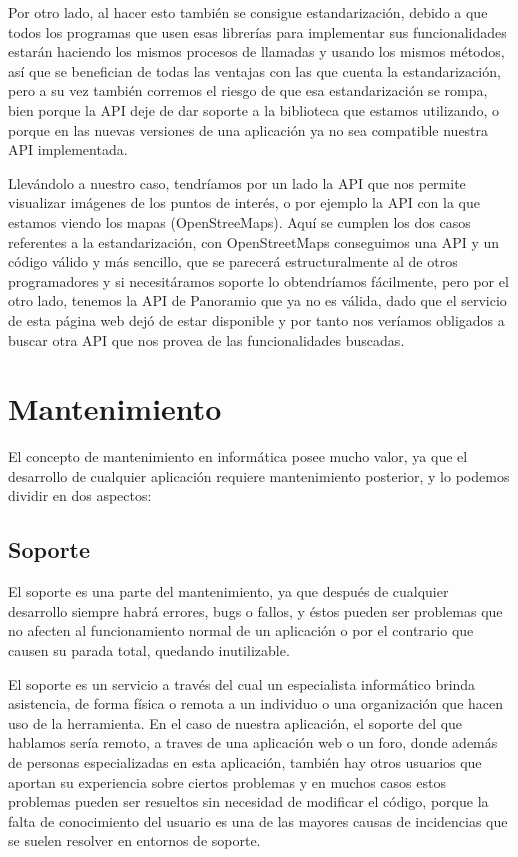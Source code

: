 Por otro lado, al hacer esto también se consigue estandarización, debido a que todos los programas que usen esas librerías para implementar sus funcionalidades estarán haciendo los mismos procesos de llamadas y usando los mismos métodos, así que se benefician de todas las ventajas con las que cuenta la estandarización, pero a su vez también corremos el riesgo de que esa estandarización se rompa, bien porque la API deje de dar soporte a la biblioteca que estamos utilizando, o porque en las nuevas versiones de una aplicación ya no sea compatible nuestra API implementada. 

Llevándolo a nuestro caso, tendríamos por un lado la API que nos permite visualizar imágenes de los puntos de interés, o por ejemplo la API con la que estamos viendo los mapas (OpenStreeMaps). Aquí se cumplen los dos casos referentes a la estandarización, con OpenStreetMaps conseguimos una API y un código válido y más sencillo, que se parecerá estructuralmente al de otros programadores y si necesitáramos soporte lo obtendríamos fácilmente, pero por el otro lado, tenemos la API de Panoramio que ya no es válida, dado que el servicio de esta página web dejó de estar disponible y por tanto nos veríamos obligados a buscar otra API que nos provea de las funcionalidades buscadas.

\section{Mantenimiento}

El concepto de mantenimiento en informática posee mucho valor, ya que el desarrollo de cualquier aplicación requiere mantenimiento posterior, y lo podemos dividir en dos aspectos:

\subsection{Soporte}

El soporte es una parte del mantenimiento, ya que después de cualquier desarrollo siempre habrá errores, bugs o fallos, y éstos pueden ser problemas que no afecten al funcionamiento normal de un aplicación o por el contrario que causen su parada total, quedando inutilizable. 

El soporte es un servicio a través del cual un especialista informático brinda asistencia, de forma física o remota a un individuo o una organización que hacen uso de la herramienta. En el caso de nuestra aplicación, el soporte del que hablamos sería remoto, a traves de una aplicación web o un foro, donde además de personas especializadas en esta aplicación, también hay otros usuarios que aportan su experiencia sobre ciertos problemas y en muchos casos estos problemas pueden ser resueltos sin necesidad de modificar el código, porque la falta de conocimiento del usuario es una de las mayores causas de incidencias que se suelen resolver en entornos de soporte.

